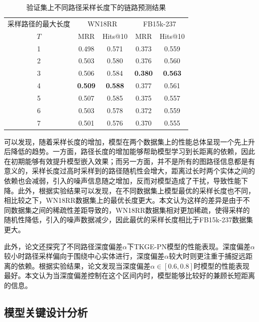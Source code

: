 \begin{table}[htbp]
    \begin{center}
        \caption{验证集上不同路径采样长度下的链路预测结果}
        \renewcommand{\arraystretch}{1.5}
        \begin{tabular}{*{5}{c}}
            \toprule
            采样路径的最大长度& \multicolumn{2}{c}{WN18RR} & \multicolumn{2}{c}{FB15k-237}\\
            \cmidrule(lr){2-3}\cmidrule(lr){4-5}
            $T$&MRR&Hits@10&MRR&Hits@10\\
            \midrule
            1	&0.498&0.571&0.373&0.559\\
            2	&0.503&0.580&0.376&0.560\\
            3	&0.506&0.584&\textbf{0.380}&\textbf{0.563}\\
            4	&\textbf{0.509}&\textbf{0.588}&0.377&0.561\\
            5	&0.507&0.585&0.375&0.557\\
            6	&0.503&0.578&0.372&0.559\\
            7	&0.501&0.576&0.370&0.555\\
            \bottomrule
        \end{tabular}
        \label{length_tab}
    \end{center}
\end{table}
  
可以发现，随着采样长度的增加，模型在两个数据集上的性能总体呈现一个先上升后降低的趋势。一方面，路径长度的增加能够帮助模型学习到长距离的依赖，因此在初期能够有效提升模型嵌入效果；而另一方面，并不是所有的图路径信息都是有意义的，采样长度过高时采样到的路径随机性会增大，距离过长时两个实体之间的依赖也会减弱，引入的噪声信息随之增加，反而对模型造成了干扰，导致性能下降。此外，根据实验结果可以发现，在不同数据集上模型最优的采样长度也不同，相比较之下，WN18RR数据集上的最优长度更大。本文认为这样的差异是由于不同数据集之间的稀疏性差距导致的，WN18RR数据集相对更加稀疏，使得采样的随机性降低，引入的噪声数据减少，因此最优的采样长度相比于FB15k-237数据集更大。

此外，论文还探究了不同路径深度偏差$\alpha$下TKGE-PN模型的性能表现。深度偏差$\alpha$较小时路径采样偏向于围绕中心实体进行，深度偏差$\alpha$较大时则更注重于捕捉远距离的依赖。根据实验结果，论文发现当深度偏差$\alpha\in\left[0.6,0.8\right] $时模型的性能表现最好。本文认为当深度偏差控制在这个区间内时，模型能够比较好的兼顾长短距离的信息。

\subsection{模型关键设计分析}

